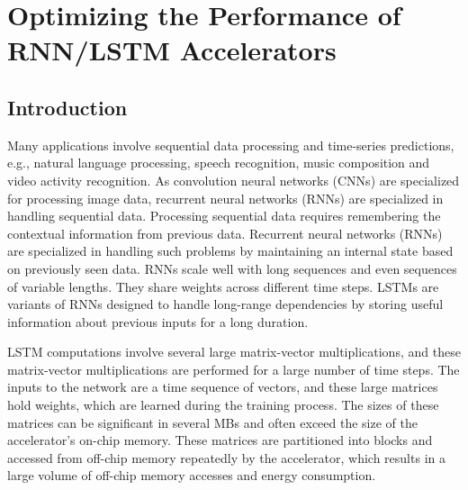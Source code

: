\graphicspath{{./Ch4-RNN/images/}}

\chapter{Optimizing the Performance of RNN/LSTM Accelerators} \label{chap:RNN}
\section{Introduction}
Many applications involve sequential data processing and time-series predictions, e.g., natural language processing, speech recognition, music composition and video activity recognition. As convolution neural networks (CNNs) are specialized for processing image data, recurrent neural networks (RNNs) are specialized in handling sequential data. Processing sequential data requires remembering the contextual information from previous data. Recurrent neural networks (RNNs) are specialized in handling such problems by maintaining an internal state based on previously seen data. RNNs scale well with long sequences and even sequences of variable lengths. They share weights across different time steps. LSTMs \cite{hochreiter1997long} are variants of RNNs designed to handle long-range dependencies by storing useful information about previous inputs for a long duration. 

LSTM computations involve several large matrix-vector multiplications, and these matrix-vector multiplications are performed for a large number of time steps. The inputs to the network are a time sequence of vectors, and these large matrices hold weights, which are learned during the training process. The sizes of these matrices can be significant in several MBs and often exceed the size of the accelerator's on-chip memory. These matrices are partitioned into blocks and accessed from off-chip memory repeatedly by the accelerator, which results in a large volume of off-chip memory accesses and energy consumption.
